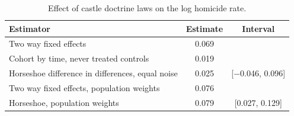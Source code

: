 \begin{table}[ht]
\centering
\caption{Effect of castle doctrine laws on the log homicide rate.}
\label{tab:castle}
\small
\begin{tabular}{lcc}
\toprule
Estimator & Estimate & Interval \\
\midrule
Two way fixed effects & 0.069 & \\
Cohort by time, never treated controls & 0.019 & \\
Horseshoe difference in differences, equal noise & 0.025 & [$-$0.046, 0.096] \\
\addlinespace
Two way fixed effects, population weights & 0.076 & \\
Horseshoe, population weights & 0.079 & [0.027, 0.129] \\
\bottomrule
\end{tabular}
\end{table}
